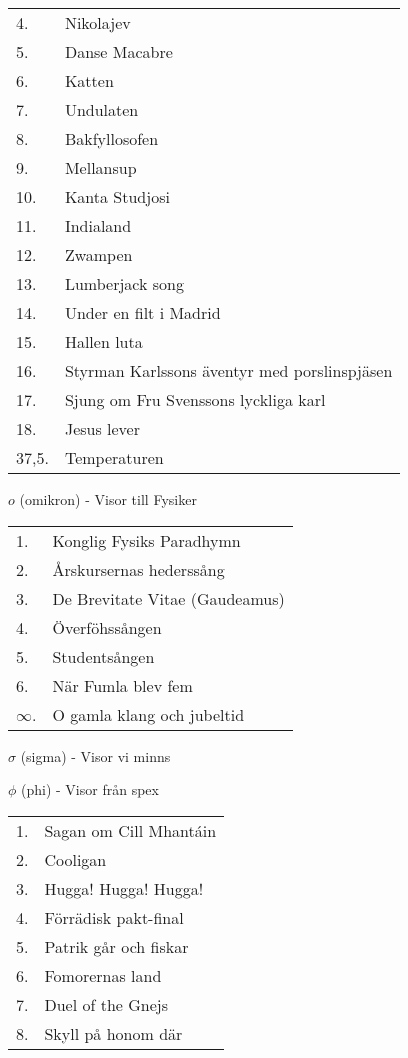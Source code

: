 \documentclass[a6paper,10pt]{article}
\begin{document}
\noindent
\begin{tabularx}{1\textwidth}{l X}
4.&Nikolajev\\
5.&Danse Macabre\\
6.&Katten \\
7.&Undulaten \\
8.&Bakfyllosofen\\
9.&Mellansup\\
10.&Kanta Studjosi\\
11.&Indialand\\
12.&Zwampen\\
13.&Lumberjack song\\
14.&Under en filt i Madrid\\
15.&Hallen luta\\
16.&Styrman Karlssons äventyr med porslinspjäsen\\
17.&Sjung om Fru Svenssons lyckliga karl\\
18.&Jesus lever\\
37,5.&Temperaturen
\end{tabularx}

\vspace{5pt}

\noindent \Large $o$ (omikron) - Visor till Fysiker

\noindent
\normalsize
\begin{tabularx}{1\textwidth}{l X}
1.&Konglig Fysiks Paradhymn\\
2.&Årskursernas hederssång\\
3.&De Brevitate Vitae (Gaudeamus)\\
4.&Överföhssången\\
5.&Studentsången\\
6.&När Fumla blev fem\\
$\infty$.&O gamla klang och jubeltid
\end{tabularx}

\vspace{5pt}

\noindent \Large $\sigma$ (sigma) - Visor vi minns

\newpage

\noindent \Large $\phi$ (phi) - Visor från spex

\noindent
\normalsize
\begin{tabularx}{1\textwidth}{l X}
1.&Sagan om Cill Mhantáin\\
2.&Cooligan\\
3.&Hugga! Hugga! Hugga!\\
4.&Förrädisk pakt-final\\
5.&Patrik går och fiskar\\
6.&Fomorernas land\\
7.&Duel of the Gnejs\\
8.&Skyll på honom där\\
\end{tabularx}
\end{document}
